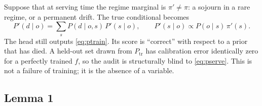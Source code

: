 \documentclass[11pt,a4paper]{article}
\numberwithin{equation}{section}
\theoremstyle{plain}
\theoremstyle{definition}
\theoremstyle{remark}
\newcommand{\ptrain}{P_{\mathrm{tr}}}
\begin{document}
Suppose that at serving time the regime marginal is $\pi' \neq \pi$: a sojourn in a rare regime, or a permanent drift. The true conditional becomes
\begin{equation}\label{eq:pserve}
P'(d\mid o) = \sum_s P(d\mid o,s)\,P'(s\mid o),\qquad P'(s\mid o)\propto P(o\mid s)\,\pi'(s).
\end{equation}
The head still outputs \eqref{eq:ptrain}. Its score is ``correct'' with respect to a prior that has died. A held-out set drawn from $\ptrain$ has calibration error identically zero for a perfectly trained $f$, so the audit is structurally blind to \eqref{eq:pserve}. This is not a failure of training; it is the absence of a variable.

\subsection{Lemma 1}
\end{document}
